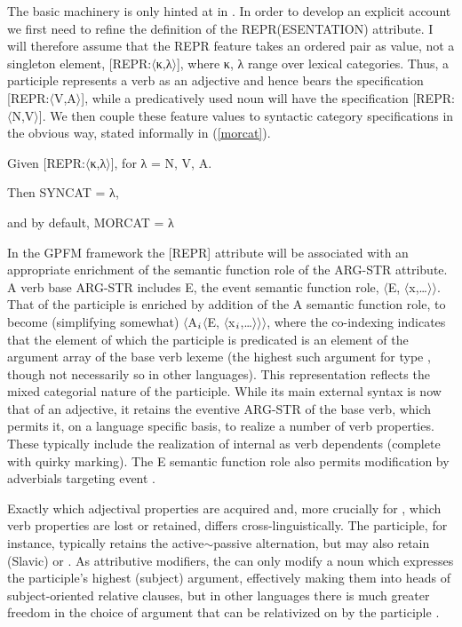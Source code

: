 \documentclass[output=paper,
modfonts
]{LSP/langsci}
\begin{document}
The basic machinery is only hinted at in \citet[Chapter ten]{Spencer13:book}. In order to develop an explicit account we first need to refine the definition of the REPR(ESENTATION) attribute. I will therefore assume that the REPR feature takes an ordered pair as value, not a singleton element, [REPR:$\langle$κ,λ$\rangle$], where κ, λ range over lexical categories. Thus, a participle represents a verb as an adjective and hence  bears the specification [REPR:$\langle$V,A$\rangle$], while a predicatively used noun will have the specification [REPR:$\langle$N,V$\rangle$]. We then couple these feature values to syntactic category specifications in the obvious way, stated  informally in (\ref{morcat}).

\begin{exe}	\ex	\label{morcat}

Given [REPR:$\langle$κ,λ$\rangle$], for λ = N, V, A. 

Then SYNCAT = λ,

and by default, MORCAT = λ
\end{exe}


In  the GPFM framework the [REPR] attribute will be associated with an appropriate enrichment of the semantic function role of the ARG-STR attribute. A  verb base ARG-STR includes E, the event semantic function role, $\langle$E, $\langle$x,\ldots$\rangle\rangle$. That of the participle is enriched by addition of the A semantic function role, to  become (simplifying somewhat) $\langle$A$\sb{i}$$\langle$E, $\langle$x$\sb{i}$,\ldots$\rangle\rangle\rangle$, 
where the co-indexing indicates that the element of which the  participle is predicated is an element of the argument array of the base verb lexeme (the highest such argument for  type , though not necessarily so in other languages). 
This representation reflects the mixed categorial nature of the participle. While its main external syntax \parencite{Haspelmath96} is now that of an adjective, it retains the eventive ARG-STR  of the base verb, which permits it, on a language specific basis, to realize a number of verb properties. These typically include the realization of internal  as verb dependents (complete with quirky  marking). The E semantic function role also permits modification by adverbials targeting event . 

Exactly which adjectival properties are acquired and, more crucially for , which verb properties are lost or retained, differs cross-linguistically. The  participle, for instance, typically retains the active$\sim$passive alternation, but may also retain  (Slavic) or   \parencite[; ][]{Lowe15:book}. As attributive modifiers, the    can only modify a noun which expresses the participle’s highest (subject) argument, effectively making them into heads of subject-oriented relative clauses, but in other languages there is much greater freedom in the choice of argument that can be relativized on by the participle %
\parencite[for discussion see][]{Spencer16:ptcprels}. 
\end{document}
